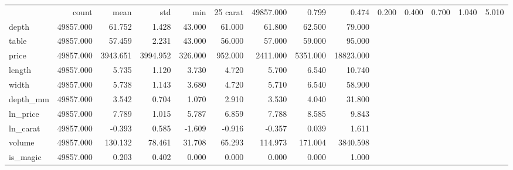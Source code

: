 \begin{tabular}{lrrrrrrrr}
\toprule
 & count & mean & std & min & 25%
\midrule
carat & 49857.000 & 0.799 & 0.474 & 0.200 & 0.400 & 0.700 & 1.040 & 5.010 \\
depth & 49857.000 & 61.752 & 1.428 & 43.000 & 61.000 & 61.800 & 62.500 & 79.000 \\
table & 49857.000 & 57.459 & 2.231 & 43.000 & 56.000 & 57.000 & 59.000 & 95.000 \\
price & 49857.000 & 3943.651 & 3994.952 & 326.000 & 952.000 & 2411.000 & 5351.000 & 18823.000 \\
length & 49857.000 & 5.735 & 1.120 & 3.730 & 4.720 & 5.700 & 6.540 & 10.740 \\
width & 49857.000 & 5.738 & 1.143 & 3.680 & 4.720 & 5.710 & 6.540 & 58.900 \\
depth_mm & 49857.000 & 3.542 & 0.704 & 1.070 & 2.910 & 3.530 & 4.040 & 31.800 \\
ln_price & 49857.000 & 7.789 & 1.015 & 5.787 & 6.859 & 7.788 & 8.585 & 9.843 \\
ln_carat & 49857.000 & -0.393 & 0.585 & -1.609 & -0.916 & -0.357 & 0.039 & 1.611 \\
volume & 49857.000 & 130.132 & 78.461 & 31.708 & 65.293 & 114.973 & 171.004 & 3840.598 \\
is_magic & 49857.000 & 0.203 & 0.402 & 0.000 & 0.000 & 0.000 & 0.000 & 1.000 \\
\bottomrule
\end{tabular}
